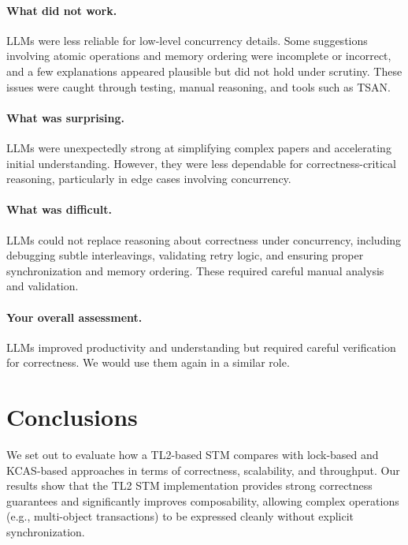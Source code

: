 \documentclass[11pt,a4paper]{article}
\begin{document}
\paragraph{What did not work.}
LLMs were less reliable for low-level concurrency details. Some suggestions involving atomic operations and memory ordering were incomplete or incorrect, and a few explanations appeared plausible but did not hold under scrutiny. These issues were caught through testing, manual reasoning, and tools such as TSAN.

\paragraph{What was surprising.}
LLMs were unexpectedly strong at simplifying complex papers and accelerating initial understanding. However, they were less dependable for correctness-critical reasoning, particularly in edge cases involving concurrency.

\paragraph{What was difficult.}
LLMs could not replace reasoning about correctness under concurrency, including debugging subtle interleavings, validating retry logic, and ensuring proper synchronization and memory ordering. These required careful manual analysis and validation.

\paragraph{Your overall assessment.}
LLMs improved productivity and understanding but required careful verification for correctness. We would use them again in a similar role.

\section{Conclusions}

We set out to evaluate how a TL2-based STM compares with lock-based and KCAS-based approaches in terms of correctness, scalability, and throughput. Our results show that the TL2 STM implementation provides strong correctness guarantees and significantly improves composability, allowing complex operations (e.g., multi-object transactions) to be expressed cleanly without explicit synchronization.
\end{document}
